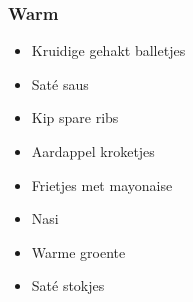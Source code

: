 \subsubsection{Warm}
\begin{itemize}
	\item	Kruidige gehakt balletjes
	\item	Saté saus
	\item	Kip spare ribs
	\item	Aardappel kroketjes
	\item	Frietjes met mayonaise
	\item	Nasi
	\item	Warme groente
	\item	Saté stokjes
\end{itemize}
